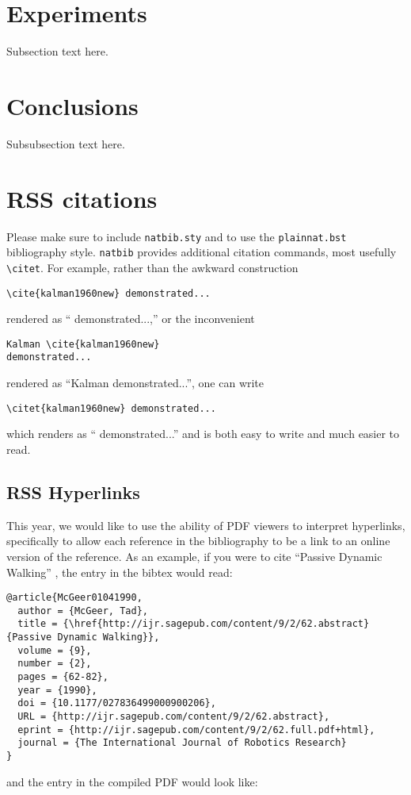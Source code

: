 \documentclass[conference]{IEEEtran}
\begin{document}
\section{Experiments}
Subsection text here.

\section{Conclusions}
Subsubsection text here.


\section{RSS citations}

Please make sure to include \verb!natbib.sty! and to use the
\verb!plainnat.bst! bibliography style. \verb!natbib! provides additional
citation commands, most usefully \verb!\citet!. For example, rather than the
awkward construction 

{\small
\begin{verbatim}
\cite{kalman1960new} demonstrated...
\end{verbatim}
}

\noindent
rendered as ``\cite{kalman1960new} demonstrated...,''
or the
inconvenient 

{\small
\begin{verbatim}
Kalman \cite{kalman1960new} 
demonstrated...
\end{verbatim}
}

\noindent
rendered as 
``Kalman \cite{kalman1960new} demonstrated...'', 
one can
write 

{\small
\begin{verbatim}
\citet{kalman1960new} demonstrated... 
\end{verbatim}
}
\noindent
which renders as ``\citet{kalman1960new} demonstrated...'' and is 
both easy to write and much easier to read.
  
\subsection{RSS Hyperlinks}

This year, we would like to use the ability of PDF viewers to interpret
hyperlinks, specifically to allow each reference in the bibliography to be a
link to an online version of the reference. 
As an example, if you were to cite ``Passive Dynamic Walking''
\cite{McGeer01041990}, the entry in the bibtex would read:

{\small
\begin{verbatim}
@article{McGeer01041990,
  author = {McGeer, Tad}, 
  title = {\href{http://ijr.sagepub.com/content/9/2/62.abstract}{Passive Dynamic Walking}}, 
  volume = {9}, 
  number = {2}, 
  pages = {62-82}, 
  year = {1990}, 
  doi = {10.1177/027836499000900206}, 
  URL = {http://ijr.sagepub.com/content/9/2/62.abstract}, 
  eprint = {http://ijr.sagepub.com/content/9/2/62.full.pdf+html}, 
  journal = {The International Journal of Robotics Research}
}
\end{verbatim}
}
\noindent
and the entry in the compiled PDF would look like:
\end{document}
